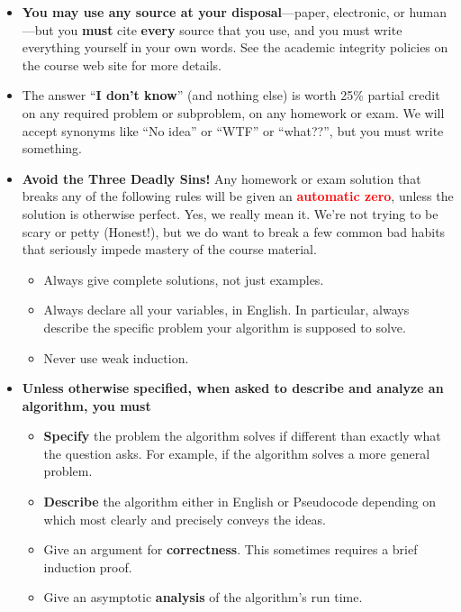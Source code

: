 \documentclass[11pt]{article}
\begin{document}
\begin{itemize}
    \item \textbf{You may use any source at your disposal}—paper, electronic, or human—but you \textbf{must}
    cite \textbf{every} source that you use, and you must write everything yourself in your own words.
    See the academic integrity policies on the course web site for more details.
    
    \item The answer “\textbf{I don’t know}” (and nothing else) is worth 25\% partial credit on any required problem or subproblem, on any homework or exam. We will accept synonyms like “No idea” or “WTF” or “what??”, but you must write something.
    
    \item \textbf{Avoid the Three Deadly Sins!} Any homework or exam solution that breaks any of the
    following rules will be given an \textcolor{red}{\textbf{automatic zero}}, unless the solution is otherwise perfect.
    Yes, we really mean it. We’re not trying to be scary or petty (Honest!), but we do want to
    break a few common bad habits that seriously impede mastery of the course material.
    \begin{itemize}
        \item Always give complete solutions, not just examples.
        \item Always declare all your variables, in English. In particular, always describe the specific problem your algorithm is supposed to solve.
        \item Never use weak induction.
    \end{itemize}
    \item \textbf{Unless otherwise specified, when asked to describe and analyze an algorithm, you must}
    \begin{itemize}
        \item \textbf{Specify} the problem the algorithm solves if different than exactly what the question asks. For example, if the algorithm solves a more general problem.
        \item \textbf{Describe} the algorithm either in English or Pseudocode depending on which most clearly and precisely conveys the ideas.
        \item Give an argument for \textbf{correctness}. This sometimes requires a brief induction proof.
        \item Give an asymptotic \textbf{analysis} of the algorithm's run time.
    \end{itemize}
\end{itemize}
\end{document}
